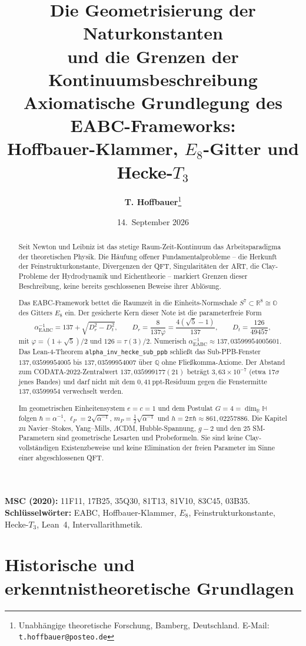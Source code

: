 \documentclass[11pt,a4paper]{article}
\title{\textbf{\texorpdfstring{Die Geometrisierung der Naturkonstanten\\
und die Grenzen der Kontinuumsbeschreibung}{Die Geometrisierung der Naturkonstanten}}\\[0.4em]
\large Axiomatische Grundlegung des EABC-Frameworks:\\
Hoffbauer-Klammer, $E_8$-Gitter und Hecke-$T_3$}
\author{\textbf{T. Hoffbauer}\thanks{Unabhängige theoretische Forschung, Bamberg, Deutschland.
E-Mail: \texttt{t.hoffbauer@posteo.de}}}
\date{14.\ September 2026}
\theoremstyle{definition}
\theoremstyle{remark}
\numberwithin{equation}{section}
\begin{document}
\maketitle

\begin{abstract}
\noindent
Seit Newton und Leibniz ist das stetige Raum-Zeit-Kontinuum das Arbeitsparadigma der theoretischen Physik.
Die Häufung offener Fundamentalprobleme -- die Herkunft der Feinstrukturkonstante, Divergenzen der QFT, Singularitäten der ART, die Clay-Probleme der Hydrodynamik und Eichentheorie -- markiert Grenzen dieser Beschreibung, keine bereits geschlossenen Beweise ihrer Ablösung.

Das EABC-Framework bettet die Raumzeit in die Einheits-Normschale $S^7\subset\mathbb{R}^8\cong\mathbb{O}$ des Gitters $E_8$ ein.
Der gesicherte Kern dieser Note ist die parameterfreie Form
\[
\alpha^{-1}_{\mathrm{EABC}}
=137+\sqrt{D_r^2-D_t^2},\qquad
D_r=\frac{8}{137\varphi}=\frac{4(\sqrt{5}-1)}{137},\qquad
D_t=\frac{126}{49457},
\]
mit $\varphi=(1+\sqrt{5})/2$ und $126=\tau(3)/2$.
Numerisch $\alpha^{-1}_{\mathrm{EABC}}\approx 137{,}03599954005601$.
Das Lean-4-Theorem \texttt{alpha\_inv\_hecke\_sub\_ppb} schließt das Sub-PPB-Fenster
$137{,}03599954005$ bis $137{,}03599954007$ über $\mathbb{Q}$ ohne Fließkomma-Axiome.
Der Abstand zum CODATA-2022-Zentralwert $137{,}035999177(21)$ beträgt $3{,}63\times 10^{-7}$
(etwa $17\sigma$ jenes Bandes) und darf nicht mit dem $0{,}41\,\mathrm{ppt}$-Residuum
gegen die Fenstermitte $137{,}03599954$ verwechselt werden.

Im geometrischen Einheitensystem $e=c=1$ und dem Postulat $G=4=\dim_{\mathbb{R}}\mathbb{H}$ folgen $\hbar=\alpha^{-1}$,
$\ell_P=2\sqrt{\alpha^{-1}}$, $m_P=\tfrac12\sqrt{\alpha^{-1}}$ und $h=2\pi\hbar\approx 861{,}02257886$.
Die Kapitel zu Navier--Stokes, Yang--Mills, $\Lambda$CDM, Hubble-Spannung, $g-2$ und den 25 SM-Parametern sind geometrische Lesarten und Probeformeln.
Sie sind keine Clay-vollständigen Existenzbeweise und keine Elimination der freien Parameter im Sinne einer abgeschlossenen QFT.
\end{abstract}

\noindent\textbf{MSC (2020):}
11F11, 17B25, 35Q30, 81T13, 81V10, 83C45, 03B35.\\
\textbf{Schlüsselwörter:}
EABC, Hoffbauer-Klammer, $E_8$, Feinstrukturkonstante, Hecke-$T_3$, Lean~4, Intervallarithmetik.

\tableofcontents

\section{Historische und erkenntnistheoretische Grundlagen}
\end{document}
